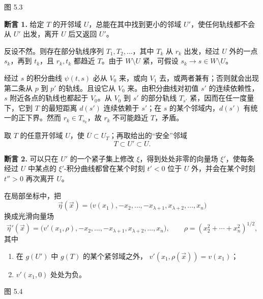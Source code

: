 \begin{center}
  \FigFiveThree

  \label{fig:5.3}图 5.3
\end{center}

\par\medskip\noindent{}\label{claim:5.1}\textbf{断言 1.}\quad
给定 $T$ 的开邻域 $U$，总能在其中找到更小的邻域 $U'$，使任何轨线都不会从 $U'$ 出发，离开 $U$ 后又返回 $U'$。

\Proof 反设不然。则存在部分轨线序列 $T_1,T_2,\ldots$，其中 $T_k$ 从 $r_k$ 出发，经过 $U$ 外的一点 $s_k$，再到 $t_k$，且 $r_k,t_k$ 都趋近 $T$。由于 $W\setminus U$ 紧，可假设 $s_k\to s\in W\setminus U$。

经过 $s$ 的积分曲线 $\psi(t,s)$ 必从 $V_0$ 来，或向 $V_1$ 去，或两者兼有；否则就会出现第二条从 $p$ 到 $p'$ 的轨线。且设它从 $V_0$ 来。由积分曲线对初值 $s'$ 的连续依赖性，$s$ 附近各点的轨线也都起于 $V_0$。从 $V_0$ 到 $s'$ 的部分轨线 $T_{s'}$ 紧，因而在任一度量下，它到 $T$ 的最短距离 $d(s')$ 连续依赖于 $s'$；在 $s$ 的某个邻域内，$d(s')$ 有统一的正下界。然而 $r_k\in T_{s_k}$，故 $r_k$ 不可能趋近 $T$，矛盾。
\EndProof

取 $T$ 的任意开邻域 $U$，使 $\overline U\subset U_T$；再取给出的“安全”邻域
\[
  T\subset U'\subset U.
\]

\par\medskip\noindent{}\label{claim:5.2}\textbf{断言 2.}\quad
可以只在 $U'$ 的一个紧子集上修改 $\xi$，得到处处非零的向量场 $\xi'$，使每条经过 $U$ 中某点的 $\xi'$-积分曲线都曾在某个时刻 $t'<0$ 位于 $U$ 外，并会在某个时刻 $t''>0$ 再次离开 $U$。

\Proof 在局部坐标中，把
\[
  \vec\eta(\vec x)=\bigl(v(x_1),-x_2,\ldots,-x_{\lambda+1},
    x_{\lambda+2},\ldots,x_n\bigr)
\]
换成光滑向量场
\[
  \vec\eta'(\vec x)=\bigl(v'(x_1,\rho),-x_2,\ldots,-x_{\lambda+1},
    x_{\lambda+2},\ldots,x_n\bigr),
  \qquad
  \rho=(x_2^2+\cdots+x_n^2)^{1/2},
\]
其中
\begin{enumerate}[label=(\roman*)]
  \item 在 $g(U')$ 中 $g(T)$ 的某个紧邻域之外，
  $v'(x_1,\rho(\vec x))=v(x_1)$；
  \item $v'(x_1,0)$ 处处为负。
\end{enumerate}

\begin{center}
  \FigFiveFour

  \label{fig:5.4}图 5.4
\end{center}

